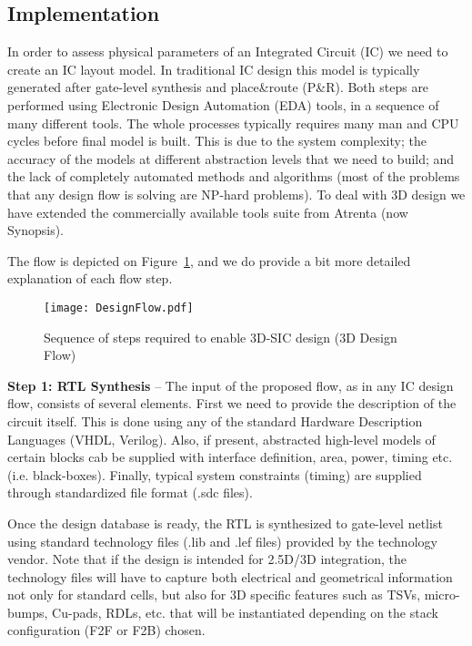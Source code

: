 \subsection{Implementation}
In order to assess physical parameters of an Integrated Circuit (IC) we need to create an IC layout model. In traditional IC design this model is typically generated after gate-level synthesis and place\&route (P\&R). Both steps are performed using Electronic Design Automation (EDA) tools, in a sequence of many different tools. The whole processes typically requires many man and CPU cycles before final model is built. This is due to the system complexity; the accuracy of the models at different abstraction levels that we need to build; and the lack of completely automated methods and algorithms (most of the problems that any design flow is solving are NP-hard problems). To deal with 3D design we have extended the commercially available tools suite from Atrenta (now Synopsis). 

The flow is depicted on Figure~\ref{fig:3DFlow}, and we do provide a bit more detailed explanation of each flow step.

\begin{figure}[!b]%
\centering
\texttt{[image: DesignFlow.pdf]}
\caption{Sequence of steps required to enable 3D-SIC design (3D Design Flow)\label{fig:3DFlow}}
\end{figure}

\textbf{Step 1: RTL Synthesis} – The input of the proposed flow, as in any IC design flow, consists of several elements. First we need to provide the description of the circuit itself. This is done using any of the standard Hardware Description Languages (VHDL, Verilog). Also, if present, abstracted high-level models of certain blocks cab be supplied with interface definition, area, power, timing etc. (i.e. black-boxes). Finally, typical system constraints (timing) are supplied through standardized file format (.sdc files). 

Once the design database is ready, the RTL is synthesized to gate-level netlist using standard technology files (.lib and .lef files) provided by the technology vendor. Note that if the design is intended for 2.5D/3D integration, the technology files will have to capture both electrical and geometrical information not only for standard cells, but also for 3D specific features such as TSVs, micro-bumps, Cu-pads, RDLs, etc. that will be instantiated depending on the stack configuration (F2F or F2B) chosen.

